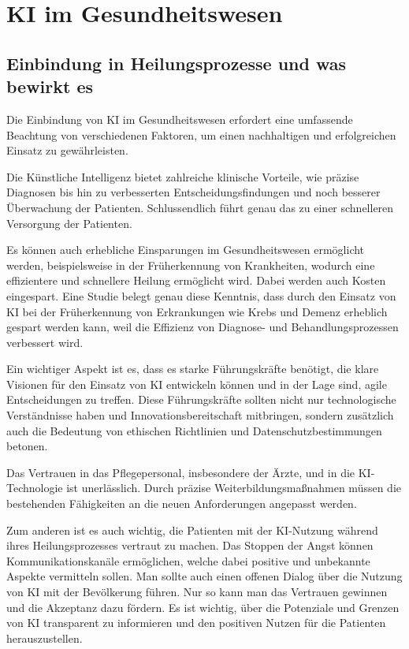 
\chapter{KI im Gesundheitswesen}

\section {Einbindung in Heilungsprozesse und was bewirkt es}

Die Einbindung von KI im Gesundheitswesen erfordert eine umfassende Beachtung von verschiedenen Faktoren, um einen nachhaltigen und erfolgreichen Einsatz zu gewährleisten.

\vspace{2mm}Die Künstliche Intelligenz bietet zahlreiche klinische Vorteile, wie präzise Diagnosen bis hin zu verbesserten Entscheidungsfindungen und noch besserer Überwachung der Patienten. Schlussendlich führt genau das zu einer schnelleren Versorgung der Patienten.

\vspace{2mm}Es können auch erhebliche Einsparungen im Gesundheitswesen ermöglicht werden, beispielsweise in der Früherkennung von Krankheiten, wodurch eine effizientere und schnellere Heilung ermöglicht wird. Dabei werden auch Kosten eingespart. Eine Studie belegt genau diese Kenntnis, dass durch den Einsatz von KI bei der Früherkennung von Erkrankungen wie Krebs und Demenz erheblich gespart werden kann, weil die Effizienz von Diagnose- und Behandlungsprozessen verbessert wird.

\vspace{6mm}Ein wichtiger Aspekt ist es, dass es starke Führungskräfte benötigt, die klare Visionen für den Einsatz von KI entwickeln können und in der Lage sind, agile Entscheidungen zu treffen. Diese Führungskräfte sollten nicht nur technologische Verständnisse haben und Innovationsbereitschaft mitbringen, sondern zusätzlich auch die Bedeutung von ethischen Richtlinien und Datenschutzbestimmungen betonen.

\vspace{2mm}Das Vertrauen in das Pflegepersonal, insbesondere der Ärzte, und in die KI-Technologie ist unerlässlich. Durch präzise Weiterbildungsmaßnahmen müssen die bestehenden Fähigkeiten an die neuen Anforderungen angepasst werden. 

\vspace{3mm}Zum anderen ist es auch wichtig, die Patienten mit der KI-Nutzung während ihres Heilungsprozesses vertraut zu machen. Das Stoppen der Angst können Kommunikationskanäle ermöglichen, welche dabei positive und unbekannte Aspekte vermitteln sollen. Man sollte auch einen offenen Dialog über die Nutzung von KI mit der Bevölkerung führen. Nur so kann man das Vertrauen gewinnen und die Akzeptanz dazu fördern. Es ist wichtig, über die Potenziale und Grenzen von KI transparent zu informieren und den positiven Nutzen für die Patienten herauszustellen.




